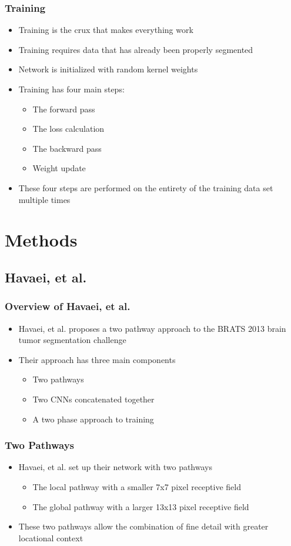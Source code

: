 \documentclass{beamer}
\begin{document}
\begin{frame}
  \frametitle{Training}
  \begin{itemize}
	\item Training is the crux that makes everything work
	\item Training requires data that has already been properly segmented
	\item Network is initialized with random kernel weights
	\item Training has four main steps:
	\begin{itemize}
	  \item The forward pass
	  \item The loss calculation
	  \item The backward pass
	  \item Weight update
	\end{itemize}
	\item These four steps are performed on the entirety of the training data set multiple times
  \end{itemize}
\end{frame}

\section*{Methods}

\subsection*{Havaei, et al.}

\begin{frame}
  \frametitle{Overview of Havaei, et al.}
  \begin{itemize}
	\item Havaei, et al. proposes a two pathway approach to the BRATS 2013 brain tumor segmentation challenge
	\item Their approach has three main components
	\begin{itemize}
	  \item Two pathways
	  \item Two CNNs concatenated together
	  \item A two phase approach to training
	\end{itemize}
  \end{itemize}
\end{frame}

\begin{frame}
  \frametitle{Two Pathways}
  \begin{itemize}
	\item Havaei, et al. set up their network with two pathways
	\begin{itemize}
	  \item The local pathway with a smaller 7x7 pixel receptive field
	  \item The global pathway with a larger 13x13 pixel receptive field
	\end{itemize}
	\item These two pathways allow the combination of fine detail with greater locational context
  \end{itemize}
\end{frame}
\end{document}
